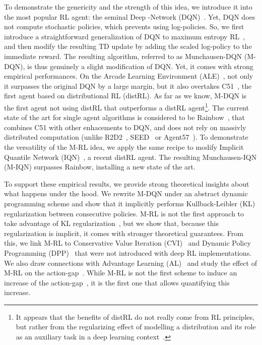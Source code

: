 \documentclass{article}
\begin{document}
To demonstrate the genericity and the strength of this idea, we introduce it into the most popular RL agent: the seminal Deep -Network (DQN)~\citep{mnih2015human}. Yet, DQN does not compute stochastic policies, which prevents using log-policies. So, we first introduce a straightforward generalization of DQN to maximum entropy RL~\cite{ziebart2010modeling,haarnoja2018soft}, and then modify the resulting TD update by adding the scaled log-policy to the immediate reward. The resulting algorithm, referred to as Munchausen-DQN (M-DQN), is thus genuinely a slight modification of DQN. Yet, it comes with  strong empirical performances. On the Arcade Learning Environment (ALE)~\cite{bellemare2013arcade}, not only it surpasses the original DQN by a large margin, but it also overtakes C51~\cite{bellemare2017distributional}, the first agent based on distributional RL (distRL). As far as we know, M-DQN is the first agent not using distRL that outperforms a distRL agent\footnote{It appears that the benefits of distRL do not really come from RL principles, but rather from the regularizing effect of modelling a distribution and its role as an auxiliary task in a deep learning
context~\cite{lyle2019comparative}.}. The current state of the art for single agent algorithms is considered to be Rainbow~\citep{hessel2018rainbow}, that combines C51 with other enhacements to DQN, and does not rely on massivly distributed computation (unlike R2D2~\cite{kapturowski2018recurrent}, SEED~\cite{Espeholt2020SEED} or Agent57~\cite{badia2020agent57}). To demonstrate the versatility of the M-RL idea, we apply the same recipe to modify Implicit Quantile Network (IQN)~\cite{dabney2018implicit}, a recent distRL agent. The resulting Munchausen-IQN (M-IQN) surpasses Rainbow, installing a new state of the art. 


To support these empirical results, we provide strong theoretical insights about what happens under the hood. We rewrite M-DQN under an abstract dynamic programming scheme and show that it implicitly performs Kullback-Leibler (KL) regularization between consecutive policies. M-RL is not the first approach to take advantage of KL regularization~\cite{schulman2015trust,abdolmaleki2018maximum}, but we show that, because this regularization is implicit, it comes with stronger theoretical guarantees. From this, we link M-RL to Conservative Value Iteration (CVI)~\cite{kozuno2019theoretical} and Dynamic Policy Programming (DPP)~\cite{azar2012dynamic} that were not introduced with deep RL implementations.
 We also draw connections with Advantage Learning (AL)~\cite{baird1999reinforcement,bellemare2016increasing} and study the effect of M-RL on the action-gap~\cite{farahmand2011action}. While M-RL is not the first scheme to induce an increase of the action-gap~\cite{bellemare2016increasing}, it is the first one that allows quantifying this increase.
\end{document}
